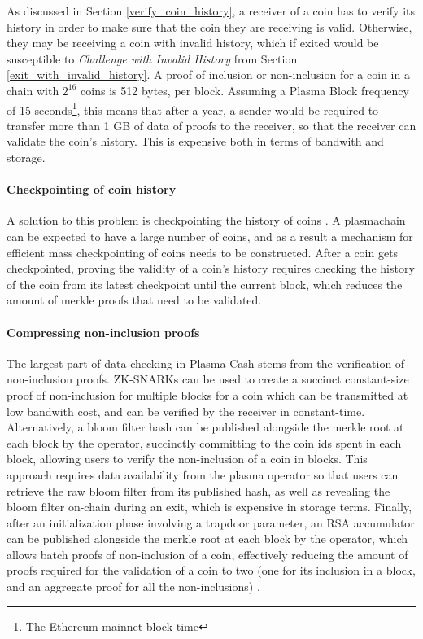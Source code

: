 As discussed in Section \ref{verify_coin_history}, a receiver of a coin has to
verify its history in order to make sure that the coin they are receiving is
valid. Otherwise, they may be receiving a coin with invalid history, which
if exited would be susceptible to \textit{Challenge with Invalid History} from Section
\ref{exit_with_invalid_history}. A proof of inclusion or non-inclusion for a
coin in a chain with $2^{16}$ coins is 512 bytes, per block. Assuming a Plasma
Block frequency of 15 seconds\footnote{The Ethereum mainnet block time}, this
means that after a year, a sender would be required to transfer more than 1 GB of
data of proofs to the receiver, so that the receiver can validate the coin's
history. This is expensive both in terms of bandwith and storage.

\paragraph{Checkpointing of coin history} A solution to this problem is checkpointing the history of coins \cite{plasma_xt}. A plasmachain can
be expected to have a large number of coins, and as a result a mechanism for
efficient mass checkpointing of coins needs to be constructed. After a coin
gets checkpointed, proving the validity of a coin's history requires checking the
history of the coin from its latest checkpoint until the current block, which reduces the amount of merkle proofs that need to be validated.


\paragraph{Compressing non-inclusion proofs} The largest part of data checking in Plasma Cash stems from the verification of non-inclusion proofs. ZK-SNARKs can be used to create a succinct constant-size proof of non-inclusion for multiple blocks for a coin which can be transmitted at low bandwith cost, and can be verified by the receiver in constant-time. Alternatively, a bloom filter hash can be published alongside the merkle root at each block by the operator, succinctly committing to the coin ids spent in each block, allowing users to verify the non-inclusion of a coin in blocks. This approach requires data availability from the plasma operator so that users can retrieve the raw bloom filter from its published hash, as well as revealing the bloom filter on-chain during an exit, which is expensive in storage terms. Finally, after an initialization phase involving a trapdoor parameter, an RSA accumulator can be published alongside the merkle root at each block by the operator, which allows batch proofs of non-inclusion of a coin, effectively reducing the amount of proofs required for the validation of a coin to two (one for its inclusion in a block, and an aggregate proof for all the non-inclusions) \cite{rsa_accum}.

